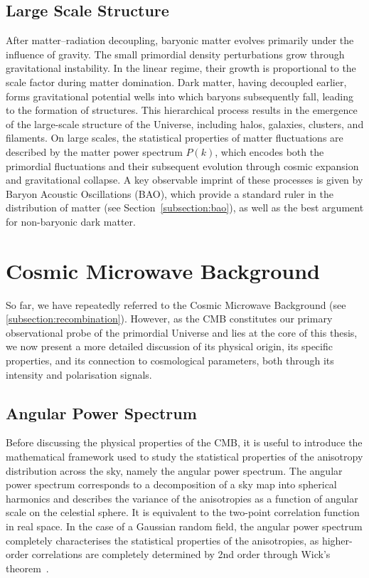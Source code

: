 \documentclass[../../thesis.tex]{subfiles}
\begin{document}
\subsection{Large Scale Structure} \label{subsection:lss}

After matter–radiation decoupling, baryonic matter evolves primarily under the influence of gravity. The small primordial density perturbations grow through gravitational instability. In the linear regime, their growth is proportional to the scale factor during matter domination.
Dark matter, having decoupled earlier, forms gravitational potential wells into which baryons subsequently fall, leading to the formation of structures. This hierarchical process results in the emergence of the large-scale structure of the Universe, including halos, galaxies, clusters, and filaments.
On large scales, the statistical properties of matter fluctuations are described by the matter power spectrum $P(k)$, which encodes both the primordial fluctuations and their subsequent evolution through cosmic expansion and gravitational collapse. 
A key observable imprint of these processes is given by Baryon Acoustic Oscillations (BAO), which provide a standard ruler in the distribution of matter (see Section~\ref{subsection:bao}), as well as the best argument for non-baryonic dark matter.

\section{Cosmic Microwave Background} \label{section:cmb}

So far, we have repeatedly referred to the Cosmic Microwave Background (see \ref{subsection:recombination}). However, as the CMB constitutes our primary observational probe of the primordial Universe and lies at the core of this thesis, we now present a more detailed discussion of its physical origin, its specific properties, and its connection to cosmological parameters, both through its intensity and polarisation signals.

\subsection{Angular Power Spectrum}

Before discussing the physical properties of the CMB, it is useful to introduce the mathematical framework used to study the statistical properties of the anisotropy distribution across the sky, namely the angular power spectrum. The angular power spectrum corresponds to a decomposition of a sky map into spherical harmonics and describes the variance of the anisotropies as a function of angular scale on the celestial sphere. It is equivalent to the two-point correlation function in real space. In the case of a Gaussian random field, the angular power spectrum completely characterises the statistical properties of the anisotropies, as higher-order correlations are completely determined by 2nd order through Wick's theorem~\cite{wick1950,dodelson}.
\end{document}
